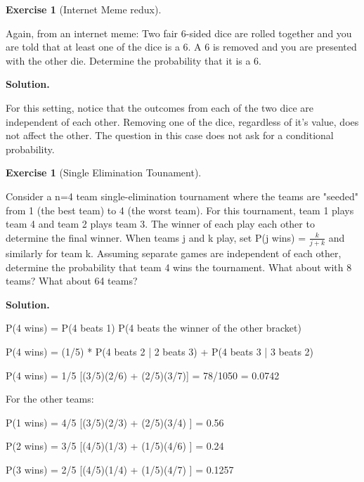 \documentclass[10pt,]{book}
\theoremstyle{plain}
\theoremstyle{definition}
\theoremstyle{definition}
\theoremstyle{definition}
\newtheorem{exercise}[theorem]{Exercise}
\numberwithin{equation}{section}
\begin{document}
\begin{exercise}[{Internet Meme redux}]\label{exercise-39}

	Again, from an internet meme:  Two fair 6-sided dice are rolled together and you are told that at least one of the dice is a 6. A 6 is removed and you are presented with the other die.  Determine the probability that it is a 6.
\par\smallskip
\noindent\textbf{Solution.}\hypertarget{solution-8}{}\quad

	For this setting, notice that the outcomes from each of the two dice are independent of each other. Removing one of the dice, regardless of it's value, does not affect the other. The question in this case does not ask for a conditional probability.
\end{exercise}
\begin{exercise}[{Single Elimination Tounament}]\label{exercise-40}

	Consider a n=4 team single-elimination tournament where the teams are "seeded" from 1 (the best team) to 4 (the worst team).  For this tournament, team 1 plays team 4 and team 2 plays team 3. The winner of each play each other to determine the final winner. When teams j and k play, set P(j wins) = \(\frac{k}{j+k}\) and similarly for team k.  Assuming separate games are independent of each other, determine the probability that team 4 wins the tournament. What about with 8 teams? What about 64 teams?
\par\smallskip
\noindent\textbf{Solution.}\hypertarget{solution-9}{}\quad

	P(4 wins) = P(4 beats 1) P(4 beats the winner of the other bracket)
\par

	P(4 wins) = (1/5) * P(4 beats 2 | 2 beats 3) + P(4 beats 3 | 3 beats 2)
\par

	P(4 wins) = 1/5 [(3/5)(2/6) + (2/5)(3/7)] = 78/1050 = 0.0742
\par

	For the other teams:
\par

	P(1 wins) = 4/5 [(3/5)(2/3) + (2/5)(3/4) ] = 0.56
\par

	P(2 wins) = 3/5 [(4/5)(1/3) + (1/5)(4/6) ] = 0.24
\par

	P(3 wins) = 2/5 [(4/5)(1/4) + (1/5)(4/7) ] = 0.1257
\end{exercise}
\typeout{************************************************}
\typeout{************************************************}
\end{document}
